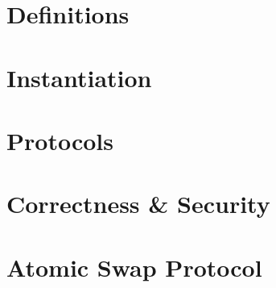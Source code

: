 \section{Definitions}\label{sec:atom:definitions}


\section{Instantiation}\label{sec:atom:inst}


\section{Protocols}\label{sec:atom:protocols}


\section{Correctness \& Security} \label{sec:atom:security}


\section{Atomic Swap Protocol}\label{sec:atom:atomic-swap}
